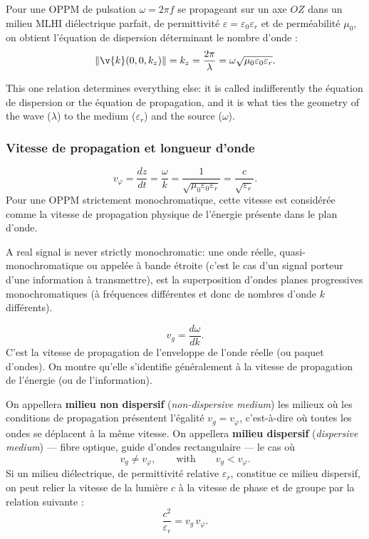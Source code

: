 \begin{theorem}
  Pour une OPPM de pulsation $\omega = 2\pi f$ se propageant sur un axe $OZ$
  dans un milieu MLHI diélectrique parfait, de permittivité
  $\varepsilon = \varepsilon_0\varepsilon_r$ et de perméabilité $\mu_0$, on
  obtient l'équation de dispersion déterminant le nombre d'onde :
  \[
    \|\v{k}(0,0,k_z)\| = k_z = \frac{2\pi}{\lambda}
      = \omega\sqrt{\mu_0\varepsilon_0\varepsilon_r}.
  \]
\end{theorem}

This one relation determines everything else: it is called indifferently the
équation de dispersion or the équation de propagation, and it is what ties the
geometry of the wave ($\lambda$) to the medium ($\varepsilon_r$) and the source
($\omega$).

\subsubsection{Vitesse de propagation et longueur d'onde}

\begin{definition}
  \[
    v_\varphi = \frac{dz}{dt} = \frac{\omega}{k}
      = \frac{1}{\sqrt{\mu_0\varepsilon_0\varepsilon_r}}
      = \frac{c}{\sqrt{\varepsilon_r}}.
  \]
  Pour une OPPM strictement monochromatique, cette vitesse est considérée comme
  la vitesse de propagation physique de l'énergie présente dans le plan d'onde.
\end{definition}

A real signal is never strictly monochromatic: une onde réelle,
quasi-monochromatique ou appelée à bande étroite (c'est le cas d'un signal
porteur d'une information à transmettre), est la superposition d'ondes planes
progressives monochromatiques (à fréquences différentes et donc de nombres
d'onde $k$ différents).

\begin{definition}
  \[
    v_g = \frac{d\omega}{dk}.
  \]
  C'est la vitesse de propagation de l'enveloppe de l'onde réelle (ou paquet
  d'ondes). On montre qu'elle s'identifie généralement à la vitesse de
  propagation de l'énergie (ou de l'information).
\end{definition}

\begin{definition}
  On appellera \textbf{milieu non dispersif} (\textit{non-dispersive medium})
  les milieux où les conditions de propagation présentent l'égalité
  $v_g = v_\varphi$, c'est-à-dire où toutes les ondes se déplacent à la même
  vitesse. On appellera \textbf{milieu dispersif} (\textit{dispersive medium})
  --- fibre optique, guide d'ondes rectangulaire --- le cas où
  \[
    v_g \ne v_\varphi,
    \qquad\text{with}\qquad
    v_g < v_\varphi .
  \]
  Si un milieu diélectrique, de permittivité relative $\varepsilon_r$,
  constitue ce milieu dispersif, on peut relier la vitesse de la lumière $c$ à
  la vitesse de phase et de groupe par la relation suivante :
  \[
    \frac{c^2}{\varepsilon_r} = v_g\,v_\varphi .
  \]
\end{definition}

